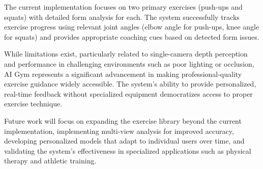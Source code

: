 \documentclass[11pt]{article}
\begin{document}
The current implementation focuses on two primary exercises (push-ups and squats) with detailed form analysis for each. The system successfully tracks exercise progress using relevant joint angles (elbow angle for push-ups, knee angle for squats) and provides appropriate coaching cues based on detected form issues.

While limitations exist, particularly related to single-camera depth perception and performance in challenging environments such as poor lighting or occlusion, AI Gym represents a significant advancement in making professional-quality exercise guidance widely accessible. The system's ability to provide personalized, real-time feedback without specialized equipment democratizes access to proper exercise technique.

Future work will focus on expanding the exercise library beyond the current implementation, implementing multi-view analysis for improved accuracy, developing personalized models that adapt to individual users over time, and validating the system's effectiveness in specialized applications such as physical therapy and athletic training.
\end{document}
